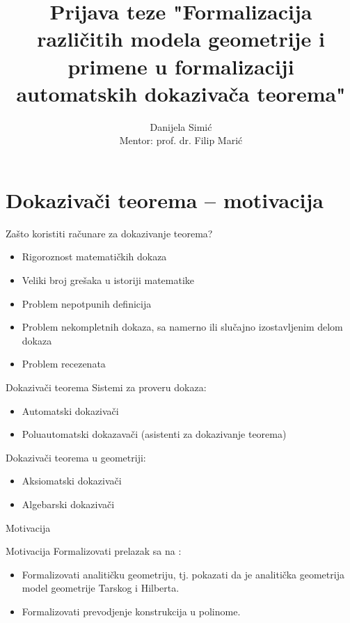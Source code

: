 \documentclass{beamer}
\title{Prijava teze "Formalizacija razli\v citih modela geometrije i primene u formalizaciji automatskih 
dokaziva\v ca teorema"}
\author[Danijela Simi\'c]{Danijela Simi\'c\\{\small Mentor: prof. dr. Filip Mari\'c}}
\date[\today]{}
\begin{document}
\begin{frame}
\titlepage
\end{frame}

\section{Dokaziva\v ci teorema -- motivacija}

\begin{frame}{Za\v sto koristiti ra\v cunare za dokazivanje teorema?}
\begin{itemize}
\item Rigoroznost matemati\v ckih dokaza
\item Veliki broj gre\v saka u istoriji matematike
\item Problem nepotpunih definicija
\item Problem nekompletnih dokaza, sa namerno ili slu\v cajno izostavljenim delom dokaza
\item Problem recezenata
\end{itemize}
\end{frame}

\begin{frame}{Dokaziva\v ci teorema}
Sistemi za proveru dokaza:
\begin{itemize}
\item Automatski dokaziva\v ci 
\item Poluautomatski dokazava\v ci (asistenti za dokazivanje teorema)
\end{itemize}

Dokaziva\v ci teorema u geometriji:
\begin{itemize}
\item Aksiomatski dokaziva\v ci
\item Algebarski dokaziva\v ci
\end{itemize}
\end{frame}


\begin{frame}{Motivacija}
\begin{center}

\end{center}
\end{frame}

\begin{frame}{Motivacija}
Formalizovati prelazak sa  na :
\begin{itemize}
\item Formalizovati analiti\v cku geometriju, tj. pokazati da je analiti\v cka geometrija model geometrije Tarskog i Hilberta.
\item Formalizovati prevodjenje konstrukcija u polinome.
\end{itemize}
\end{frame}
\end{document}
